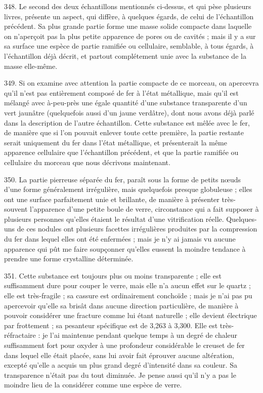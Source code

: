 \documentclass[a4paper, 11pt, oneside, polutonikogreek, french]{article}
\begin{document}
348. Le second des deux échantillons mentionnés ci-dessus, et qui pèse plusieurs livres, présente un aspect, qui diffère, à quelques égards, de celui de l'échantillon précédent. Sa plus grande partie forme une masse solide compacte dans laquelle on n'aperçoit pas la plus petite apparence de pores ou de cavités ; mais il y a sur sa surface une espèce de partie ramifiée ou cellulaire, semblable, à tous égards, à l'échantillon déjà décrit, et partout complétement unie avec la substance de la masse elle-même.

349. Si on examine avec attention la partie compacte de ce morceau, on apercevra qu'il n'est pas entièrement composé de fer à l'état métallique, mais qu'il est mélangé avec à-peu-près une égale quantité d'une substance transparente d'un vert jaunâtre (quelquefois aussi d'un jaune verdâtre), dont nous avons déjà parlé dans la description de l'autre échantillon. Cette substance est mêlée avec le fer, de manière que si l'on pouvait enlever toute cette première, la partie restante serait uniquement du fer dans l'état métallique, et présenterait la même apparence cellulaire que l'échantillon précédent, et que la partie ramifiée ou cellulaire du morceau que nous décrivons maintenant.

350. La partie pierreuse séparée du fer, paraît sous la forme de petits nœuds d'une forme généralement irrégulière, mais quelquefois presque globuleuse ; elles ont une surface parfaitement unie et brillante, de manière à présenter très-souvent l'apparence d'une petite boule de verre, circonstance qui a fait supposer à plusieurs personnes qu'elles étaient le résultat d'une vitrification réelle. Quelques-uns de ces nodules ont plusieurs facettes irrégulières produites par la compression du fer dans lequel elles ont été enfermées ; mais je n'y ai jamais vu aucune apparence qui pût me faire soupçonner qu'elles eussent la moindre tendance à prendre une forme crystalline déterminée.

351. Cette substance est toujours plus ou moins transparente ; elle est suffisamment dure pour couper le verre, mais elle n'a aucun effet sur le quartz ; elle est très-fragile ; sa cassure est ordinairement conchoïde ; mais je n'ai pas pu apercevoir qu'elle sa brisât dans aucune direction particulière, de manière à pouvoir considérer une fracture comme lui étant naturelle ; elle devient électrique par frottement ; sa pesanteur spécifique est de 3,263 à 3,300. Elle est très-réfractaire : je l'ai maintenue pendant quelque temps à un degré de chaleur suffisamment fort pour oxyder à une profondeur considérable le creuset de fer dans lequel elle était placée, sans lui avoir fait éprouver aucune altération, excepté qu'elle a acquis un plus grand degré d'intensité dans sa couleur. Sa transparence n'était pas du tout diminuée. Je pense aussi qu'il n'y a pas le moindre lieu de la considérer comme une espèce de verre.
\end{document}
